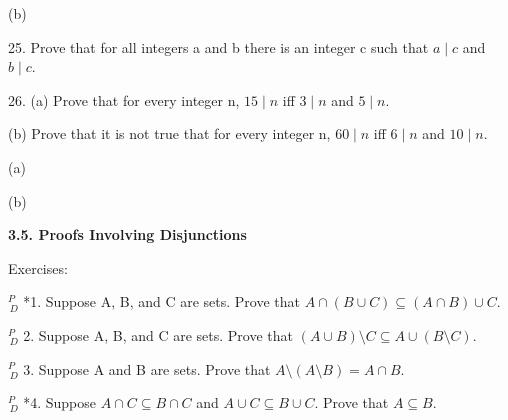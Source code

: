 \documentclass{article}
\begin{document}
(b)

\vspace{30pt}

25. Prove that for all integers a and b there is an integer c such that $a \mid c$ and $b \mid c$.
\vspace{30pt}



\vspace{30pt}

26. (a) Prove that for every integer n, $15 \mid n$ iff $3 \mid n$ and $5 \mid n$.

\hspace{12pt}(b) Prove that it is not true that for every integer n, $60 \mid n$ iff $6 \mid n$ and
$10 \mid n$.
\vspace{30pt}

(a)

\vspace{30pt}

(b)

\vspace{50pt}

\textbf{3.5. Proofs Involving Disjunctions}

Exercises:
\vspace{30pt}

$^{\textit{P}}_{\, \textit{D}}$ *1. Suppose A, B, and C are sets. Prove that $A \cap (B \cup C) \subseteq (A \cap B) \cup C$.
\vspace{30pt}



\vspace{30pt}

$^{\textit{P}}_{\, \textit{D}}$ 2. Suppose A, B, and C are sets. Prove that $(A \cup B) \setminus C \subseteq A \cup (B \setminus C)$.

\vspace{30pt}



\vspace{30pt}

$^{\textit{P}}_{\, \textit{D}}$ 3. Suppose A and B are sets. Prove that $A \setminus (A \setminus B) = A \cap B$.

\vspace{30pt}



\vspace{30pt}

$^{\textit{P}}_{\, \textit{D}}$ *4. Suppose $A \cap C \subseteq B \cap C$ and $A \cup C \subseteq B \cup C$. Prove that $A \subseteq B$.
\end{document}
